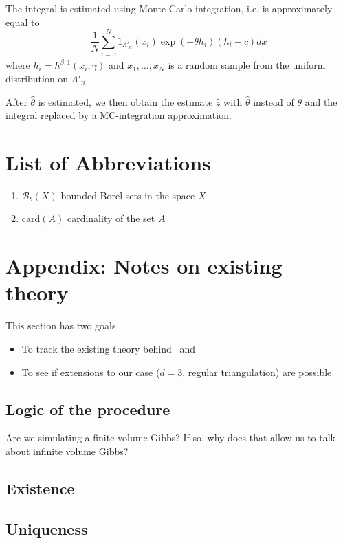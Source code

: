 \documentclass[12pt,a4paper]{report}
\begin{document}
The integral is estimated using Monte-Carlo integration, i.e. is approximately equal to
$$ \frac 1N \sum_{i=0}^N 1_{\Lambda'_n}(x_i) \exp{\left( - \theta h_i \right )} (h_i- c) dx $$
where $h_i = h^{\hat\beta,1}(x_i, \gamma)$ and $x_1,\dots,x_N$ is a random sample from the uniform distribution on $\Lambda'_n$

After $\hat\theta$ is estimated, we then obtain the estimate $\hat z$ with $\hat\theta$ instead of $\theta$ and the integral replaced by a MC-integration approximation.



{}



\listoftodos

\section*{List of Abbreviations}
\begin{enumerate}
    \item $\mathcal B_b(X)$ bounded Borel sets in the space $X$
    \item $\text{card}(A)$ cardinality of the set $A$
\end{enumerate}

\section*{Appendix: Notes on existing theory}
This section has two goals
\begin{itemize}
\item To track the existing theory behind~\cite{DL10} and
\item To see if extensions to our case ($d=3$, regular triangulation) are possible
\end{itemize}
\subsection{Logic of the procedure}
Are we simulating a finite volume Gibbs? If so, why does that allow us to talk about infinite volume Gibbs? 
\subsection{Existence}

\subsection{Uniqueness}
\end{document}
